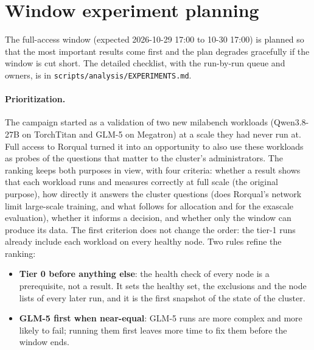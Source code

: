\section{Window experiment planning}
\label{app:planning}

The full-access window (expected 2026-10-29 17:00 to 10-30 17:00) is planned so that the most important
results come first and the plan degrades gracefully if the window is cut short. The detailed checklist,
with the run-by-run queue and owners, is in \texttt{scripts/analysis/EXPERIMENTS.md}.

\paragraph{Prioritization.} The campaign started as a validation of two new milabench workloads (Qwen3.8-27B
on TorchTitan and GLM-5 on Megatron) at a scale they had never run at. Full access to Rorqual turned it into
an opportunity to also use these workloads as probes of the questions that matter to the cluster's
administrators. The ranking keeps both purposes in view, with four criteria: whether a result shows that
each workload runs and measures correctly at full scale (the original purpose), how directly it answers the
cluster questions (does Rorqual's network limit large-scale training, and what follows for allocation and
for the exascale evaluation), whether it informs a decision, and whether only the window can produce its
data. The first criterion does not change the order: the tier-1 runs already include each workload on every
healthy node. Two rules refine the ranking:
\begin{itemize}[leftmargin=*, itemsep=1pt]
  \item \textbf{Tier 0 before anything else}: the health check of every node is a prerequisite, not a
        result. It sets the healthy set, the exclusions and the node lists of every later run, and it is
        the first snapshot of the state of the cluster.
  \item \textbf{GLM-5 first when near-equal}: GLM-5 runs are more complex and more likely to fail; running
        them first leaves more time to fix them before the window ends.
\end{itemize}

